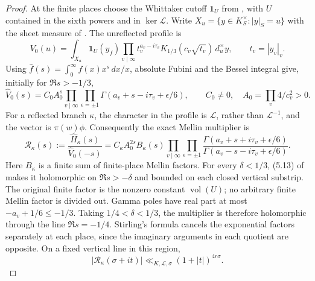 \documentclass[11pt,a4paper]{article}
\theoremstyle{remark}\newtheorem{remark}[theorem]{Remark}
\newcommand{\one}{\mathbf 1}
\numberwithin{equation}{section}
\begin{document}
\begin{proof}
At the finite places choose the Whittaker cutoff $\one_U$ from
\cite[Lemma 5.3]{P}, with $U$ contained in the sixth powers and in
$\ker\mathscr L$.  Write
$X_u=\{y\in K_S^\times:|y|_S=u\}$ with the sheet measure of
\cite[(5.15)]{P}.  The unreflected profile is
\[
 V_0(u)=\int_{X_u}\one_U(y_f)
       \prod_{v\mid\infty}t_v^{a_v-i\tau_v}
                          K_{1/3}(c_v\sqrt{t_v})\,d_u^\times y,
 \qquad t_v=|y_v|_v.
\]
Using $\widehat f(s)=\int_0^\infty f(x)x^s\,dx/x$, absolute Fubini
and the Bessel integral give, initially for $\Re s>-1/3$,
\[
 \widehat V_0(s)=C_0 A_0^s
   \prod_{v\mid\infty}\prod_{\epsilon=\pm1}
      \Gamma(a_v+s-i\tau_v+\epsilon/6),
 \qquad C_0\ne0,\quad A_0=\prod_v4/c_v^2>0.
\]
For a reflected branch $\kappa$, the character in the profile is
$\mathscr L$, rather than $\mathscr L^{-1}$, and the vector is
$\pi(w)\phi$.  Consequently the exact Mellin multiplier is
\begin{equation}\label{eq-general-arch-ratio}
 \mathcal R_\kappa(s)
 :=\frac{\widehat H_\kappa(s)}{\widehat V_0(-s)}
 =C_\kappa A_0^{2s}B_\kappa(s)
  \prod_{v\mid\infty}\prod_{\epsilon=\pm1}
   \frac{\Gamma(a_v+s+i\tau_v+\epsilon/6)}
        {\Gamma(a_v-s-i\tau_v+\epsilon/6)} .
\end{equation}
Here $B_\kappa$ is a finite sum of finite-place Mellin factors.
For every $\delta<1/3$, (5.13) of \cite{P} makes it holomorphic
on $\Re s>-\delta$ and bounded on each closed vertical substrip.
The original finite factor is the nonzero constant $\operatorname{vol}(U)$;
no arbitrary finite Mellin factor is divided out.
Gamma poles have real part at most $-a_v+1/6\le-1/3$.
Taking $1/4<\delta<1/3$, the multiplier is therefore holomorphic
through the line $\Re s=-1/4$.  Stirling's formula cancels the
exponential factors separately at each place, since the imaginary
arguments in each quotient are opposite.  On a fixed vertical line
in this region,
\[
        |\mathcal R_\kappa(\sigma+it)|
             \ll_{K,\mathscr L,\sigma}(1+|t|)^{4r\sigma}.
\]


\end{proof}
\end{document}

